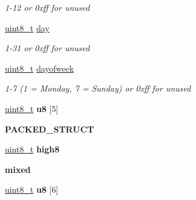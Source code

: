 \begin{DoxyCompactItemize}
\begin{DoxyCompactList}\small\item\em 1-\/12 or 0xff for unused \end{DoxyCompactList}\item 
\hypertarget{group__zcl__types_ga72369a1087b2aeffe374bb054cb97c12}{\hyperlink{group__hal_gae1affc9ca37cfb624959c866a73f83c2}{uint8\-\_\-t} \hyperlink{group__zcl__types_ga72369a1087b2aeffe374bb054cb97c12}{day}}\label{group__zcl__types_ga72369a1087b2aeffe374bb054cb97c12}

\begin{DoxyCompactList}\small\item\em 1-\/31 or 0xff for unused \end{DoxyCompactList}\item 
\hypertarget{group__zcl__types_gaf19fd1d4c2d4e9354c68c3b5546b7d41}{\hyperlink{group__hal_gae1affc9ca37cfb624959c866a73f83c2}{uint8\-\_\-t} \hyperlink{group__zcl__types_gaf19fd1d4c2d4e9354c68c3b5546b7d41}{dayofweek}}\label{group__zcl__types_gaf19fd1d4c2d4e9354c68c3b5546b7d41}

\begin{DoxyCompactList}\small\item\em 1-\/7 (1 = Monday, 7 = Sunday) or 0xff for unused \end{DoxyCompactList}\item 
\hypertarget{group__zcl__types_gad4679e287f6f18ba62228daa926eea7b}{\hyperlink{group__hal_gae1affc9ca37cfb624959c866a73f83c2}{uint8\-\_\-t} {\bfseries u8} \mbox{[}5\mbox{]}}\label{group__zcl__types_gad4679e287f6f18ba62228daa926eea7b}

\item 
{\bfseries P\-A\-C\-K\-E\-D\-\_\-\-S\-T\-R\-U\-C\-T}
\item 
\hypertarget{group__zcl__types_gac0be63c87188a7765bd25f38f3bf5b9e}{\hyperlink{group__hal_gae1affc9ca37cfb624959c866a73f83c2}{uint8\-\_\-t} {\bfseries high8}}\label{group__zcl__types_gac0be63c87188a7765bd25f38f3bf5b9e}

\item 
\hypertarget{group__zcl__types_ga1c5d0403e0a7a57d3778e56e8798faa8}{{\bfseries mixed}}\label{group__zcl__types_ga1c5d0403e0a7a57d3778e56e8798faa8}

\item 
\hypertarget{group__zcl__types_ga0989b828fcba5b50454c134bb08c46ac}{\hyperlink{group__hal_gae1affc9ca37cfb624959c866a73f83c2}{uint8\-\_\-t} {\bfseries u8} \mbox{[}6\mbox{]}}\label{group__zcl__types_ga0989b828fcba5b50454c134bb08c46ac}


\end{DoxyCompactItemize}
